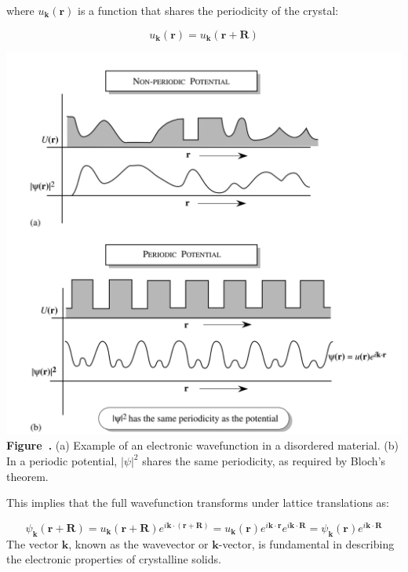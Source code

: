 where \( u_{\mathbf{k}}(\mathbf{r}) \) is a function that shares the periodicity of the crystal:

\begin{equation*}
	u_{\mathbf{k}}(\mathbf{r}) = u_{\mathbf{k}}(\mathbf{r} + \mathbf{R})
\end{equation*}

\begin{center}
	\begin{minipage}{0.6\textwidth}
		\centering
		\includegraphics[width=\textwidth]{img/periodic_potential.png}
		\\[0.5em]
		\textbf{Figure~\thefigure.} (a) Example of an electronic wavefunction in a disordered material. (b) In a periodic potential, \( |\psi|^2 \) shares the same periodicity, as required by Bloch's theorem.
		\label{fig:periodic_potential}
	\end{minipage}
\end{center}

This implies that the full wavefunction transforms under lattice translations as:

\begin{equation*}
	\psi_{\mathbf{k}}(\mathbf{r} + \mathbf{R}) = u_{\mathbf{k}}(\mathbf{r} + \mathbf{R}) e^{i\mathbf{k} \cdot (\mathbf{r} + \mathbf{R})} = u_{\mathbf{k}}(\mathbf{r}) e^{i\mathbf{k} \cdot \mathbf{r}} e^{i\mathbf{k} \cdot \mathbf{R}} = \psi_{\mathbf{k}}(\mathbf{r}) e^{i\mathbf{k} \cdot \mathbf{R}}
\end{equation*}
The vector \( \mathbf{k} \), known as the wavevector or \( \mathbf{k} \)-vector, is fundamental in describing the electronic properties of crystalline solids.

